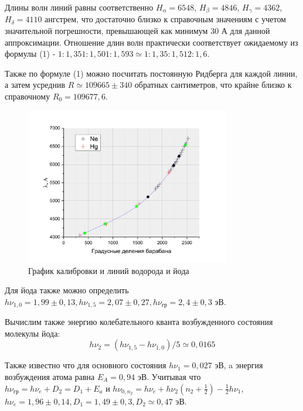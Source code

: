 \documentclass[a4paper, 12pt]{article}
\begin{document}
Длины волн линий равны соответственно $H_{\alpha} = 6548$, $H_{\beta} = 4846$, $H_{\gamma} = 4362$, $H_{\delta} = 4110$ ангстрем, что достаточно близко к справочным значениям с учетом значительной погрешности, превышающей как минимум 30 А для данной аппроксимации. Отношение длин волн практически соответствует ожидаемому из формулы (1) - $1:1,351:1,501:1,593 \simeq 1:1,35:1,512:1,6$.

Также по формуле (1) можно посчитать постоянную Ридберга для каждой линии, а затем усреднив $R \simeq 109665	\pm 340$ обратных сантиметров, что крайне близко к справочному $R_0 = 109677,6$.

\begin{figure}[h!]
    \begin{center}
    \includegraphics[width=0.8\textwidth]{calibrovka.png}
    \end{center}
    \caption{График калибровки и линий водорода и йода}
\end{figure}

Для йода также можно определить $h\nu_{1,0} = 1,99 \pm 0,13, h\nu_{1,5}=2,07 \pm 0,27, h\nu_{\text{гр}}=2,4 \pm 0,3$ эВ.

Вычислим также энергию колебательного кванта возбужденного состояния молекулы йода:
\[h\nu_2 = (h\nu_{1,5}-h\nu_{1,0})/5 \simeq 0,0165\]

Также известно что для основного состояния $h\nu_1 = 0,027$ эВ, a энергия возбуждения атома равна $E_A = 0,94$ эВ. Учитывая что $h\nu_{\text{гр}} = h\nu_e + D_2 = D_1 + E_a$ и $h\nu_{0,n_2} = h\nu_e + h\nu_2\left(n_2 + \frac{1}{2}\right) - \frac{1}{2}h\nu_1$, $h\nu_e = 1,96 \pm 0,14, D_1=1,49 \pm 0,3, D_2 \simeq 0,47$ эВ.
\end{document}
